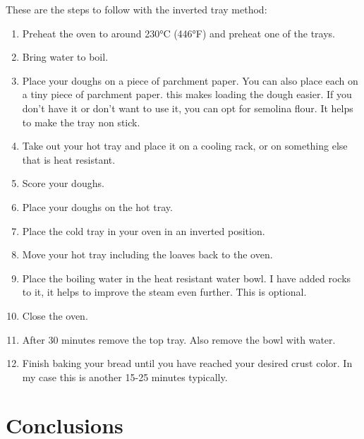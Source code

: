 These are the steps to follow with the inverted tray method:
\begin{enumerate}
\item Preheat the oven to around 230°C (446°F) and 
preheat one of the trays.
\item Bring water to boil.
\item Place your doughs on a piece of parchment paper. You
can also place each on a tiny piece of parchment paper.
this makes loading the dough easier. If you don't
have it or don't want to use it, you can opt for 
semolina flour. It helps to make the tray non stick.
\item Take out your hot tray and place it
on a cooling rack, or on something else that
is heat resistant.
\item Score your doughs.
\item Place your doughs on the hot tray.
\item Place the cold tray in your oven in an inverted position.
\item Move your hot tray including the loaves back
to the oven.
\item Place the boiling water in the heat resistant
water bowl. I have added rocks to it, it helps
to improve the steam even further. This is optional.
\item Close the oven.
\item After 30 minutes remove the top tray. Also remove the bowl with water.
\item Finish baking your bread until you have reached your desired
crust color. In my case this is another 15-25 minutes typically.
\end{enumerate}

\section{Conclusions}

